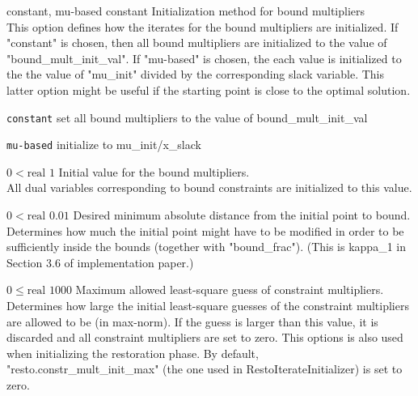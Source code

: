 %
{\ttfamily constant, mu-based}%
{constant}%
{Initialization method for bound multipliers\\
This option defines how the iterates for the bound multipliers are initialized.  If "constant" is chosen, then all bound multipliers are initialized to the value of "bound\_mult\_init\_val".  If "mu-based" is chosen, the each value is initialized to the the value of "mu\_init" divided by the corresponding slack variable.  This latter option might be useful if the starting point is close to the optimal solution.}%
{\begin{list}{}{
\setlength{\parsep}{0em}
\setlength{\leftmargin}{5ex}
\setlength{\labelwidth}{2ex}
\setlength{\itemindent}{0ex}
\setlength{\topsep}{0pt}}
\item[\texttt{constant}] set all bound multipliers to the value of bound\_mult\_init\_val
\item[\texttt{mu-based}] initialize to mu\_init/x\_slack
\end{list}
}

%
{$0<\textrm{real}$}%
{$1$}%
{Initial value for the bound multipliers.\\
All dual variables corresponding to bound constraints are initialized to this value.}%
{}

%
{$0<\textrm{real}$}%
{$0.01$}%
{Desired minimum absolute distance from the initial point to bound.\\
Determines how much the initial point might have to be modified in order to be sufficiently inside the bounds (together with "bound\_frac").  (This is kappa\_1 in Section 3.6 of implementation paper.)}%
{}

%
{$0\leq\textrm{real}$}%
{$1000$}%
{Maximum allowed least-square guess of constraint multipliers.\\
Determines how large the initial least-square guesses of the constraint multipliers are allowed to be (in max-norm). If the guess is larger than this value, it is discarded and all constraint multipliers are set to zero.  This options is also used when initializing the restoration phase. By default, "resto.constr\_mult\_init\_max" (the one used in RestoIterateInitializer) is set to zero.}%
{}

